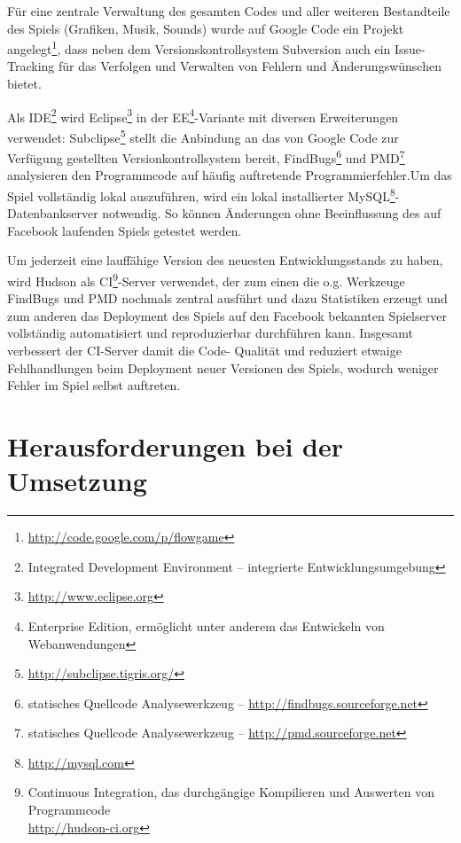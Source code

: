 \documentclass[a4paper,12pt]{scrartcl}
\begin{document}
Für eine zentrale Verwaltung des gesamten Codes und aller weiteren Bestandteile des
Spiels (Grafiken, Musik, Sounds) wurde auf Google Code ein Projekt angelegt\footnote{\url{http://code.google.com/p/flowgame}}, dass neben dem Versionskontrollsystem Subversion auch ein Issue-Tracking für das Verfolgen und Verwalten von Fehlern und Änderungswünschen bietet.

Als IDE\footnote{Integrated Development Environment -- integrierte
Entwicklungsumgebung} wird Eclipse\footnote{\url{http://www.eclipse.org}} in der EE\footnote{Enterprise Edition,
ermöglicht unter anderem das Entwickeln von Webanwendungen}-Variante mit
diversen Erweiterungen verwendet:
Subclipse\footnote{\url{http://subclipse.tigris.org/}} stellt die Anbindung an
das von Google Code zur Verfügung gestellten
Versionkontrollsystem bereit, FindBugs\footnote{statisches Quellcode Analysewerkzeug -- \url{http://findbugs.sourceforge.net}} und PMD\footnote{statisches Quellcode Analysewerkzeug -- \url{http://pmd.sourceforge.net}} analysieren den Programmcode auf häufig auftretende
Programmierfehler.\newline Um das Spiel vollständig lokal auszuführen, wird ein
lokal installierter MySQL\footnote{\url{http://mysql.com}}-Daten\-bankserver notwendig. So können Änderungen ohne Beeinflussung des auf Facebook laufenden Spiels getestet werden.

Um jederzeit eine lauffähige Version des neuesten Entwicklungsstands zu haben, wird
Hudson als CI\footnote{Continuous Integration, das durchgängige Kompilieren und Auswerten von Programmcode\\ \url{http://hudson-ci.org}}-Server verwendet, der zum einen die o.g. Werkzeuge FindBugs
und PMD nochmals zentral ausführt und dazu Statistiken erzeugt und zum anderen das
Deployment des Spiels auf den Facebook bekannten Spielserver vollständig automatisiert
und reproduzierbar durchführen kann. Insgesamt verbessert der CI-Server damit die Code-
Qualität und reduziert etwaige Fehlhandlungen beim Deployment neuer Versionen des
Spiels, wodurch weniger Fehler im Spiel selbst auftreten.

\section{Herausforderungen bei der Umsetzung}
\end{document}
